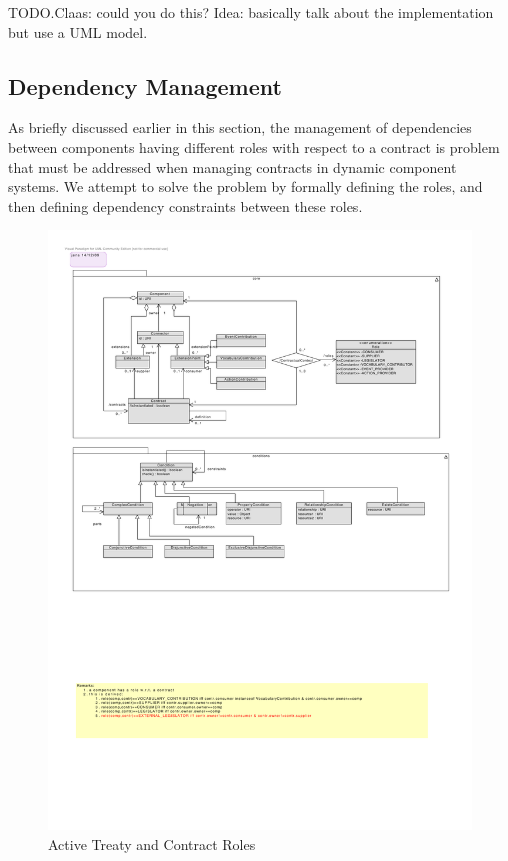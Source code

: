 \documentclass{llncs}
\begin{document}
TODO.Claas: could you do this? Idea: basically talk about the implementation but use a UML model. 

\subsection{Dependency Management}

As briefly discussed earlier in this section, the management of dependencies between components having different roles with respect to a contract is problem that must be addressed when managing contracts in dynamic component systems. We attempt to solve the problem by formally defining the roles, and then defining dependency constraints between these roles. 

 \begin{figure}[t]
\centering
\includegraphics[width=1.0\textwidth]{RoleModel2.pdf}
\caption{Active Treaty and Contract Roles}
\label{fig2}
\end{figure}
\end{document}

